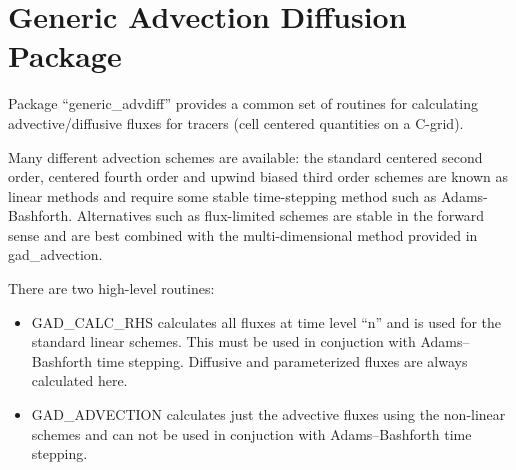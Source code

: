 
\chapter{Generic Advection Diffusion Package}
  
Package ``generic\_advdiff'' provides a common set of routines for
calculating advective/diffusive fluxes for tracers (cell centered
quantities on a C-grid).
  
Many different advection schemes are available: the standard centered
second order, centered fourth order and upwind biased third order
schemes are known as linear methods and require some stable
time-stepping method such as Adams-Bashforth. Alternatives such as
flux-limited schemes are stable in the forward sense and are best
combined with the multi-dimensional method provided in gad\_advection.
  
There are two high-level routines:
\begin{itemize}
\item{GAD\_CALC\_RHS} calculates all fluxes at time level ``n'' and is
  used for the standard linear schemes. This must be used in
  conjuction with Adams--Bashforth time stepping. Diffusive and
  parameterized fluxes are always calculated here.
  
\item{GAD\_ADVECTION} calculates just the advective fluxes using the
  non-linear schemes and can not be used in conjuction with
  Adams--Bashforth time stepping.
\end{itemize} 

